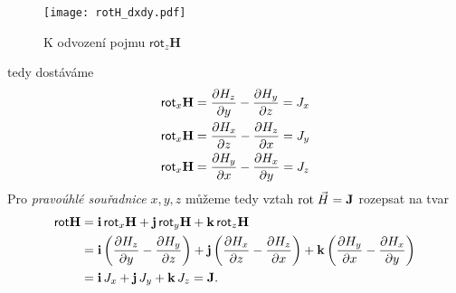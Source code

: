       \begin{figure}[ht!]
        \centering
        \texttt{[image: rotH\_dxdy.pdf]}
        \caption[K odvození pojmu $\textsf{rot}_z\mathbf{H}$]{K odvození pojmu
                 $\textsf{rot}_z\mathbf{H}$}
        \label{TEMP:fig_rotH_dxdy}
      \end{figure}            
      tedy dostáváme
      \begin{align}\label{TEMP:eq_amp_z5}
        \textsf{rot}_x\mathbf{H} &= \frac{\partial H_z}{\partial y} - \frac{\partial H_y}{\partial z} = J_x      \\ \nonumber
        \textsf{rot}_x\mathbf{H} &= \frac{\partial H_x}{\partial z} - \frac{\partial H_z}{\partial x} = J_y      \\ \nonumber
        \textsf{rot}_x\mathbf{H} &= \frac{\partial H_y}{\partial x} - \frac{\partial H_x}{\partial y} = J_z            
      \end{align}        
      Pro \emph{pravoúhlé souřadnice} $x, y, z$ můžeme tedy vztah $\mathrm{rot}\;\vec{H} = \mathbf{J}$ rozepsat na
      tvar
      \begin{align}\label{TEMP:eq_amp_z6}
        \textsf{rot}\mathbf{H} 
          &= \mathbf{i}\,\textsf{rot}_x\mathbf{H} + \mathbf{j}\,\textsf{rot}_y\mathbf{H} +
             \mathbf{k}\,\textsf{rot}_z\mathbf{H} \\ \nonumber &= \mathbf{i}\left(\frac{\partial H_z}{\partial y} -
             \frac{\partial H_y}{\partial z}\right) +  \mathbf{j}\left(\frac{\partial H_x}{\partial z} - \frac{\partial H_z}{\partial x}\right) +
             \mathbf{k}\left(\frac{\partial H_y}{\partial x} - \frac{\partial H_x}{\partial y}\right)                           \\ \nonumber 
          &= \mathbf{i}\,J_x + \mathbf{j}\,J_y + \mathbf{k}\,J_z = \mathbf{J}.
      \end{align}          
      
